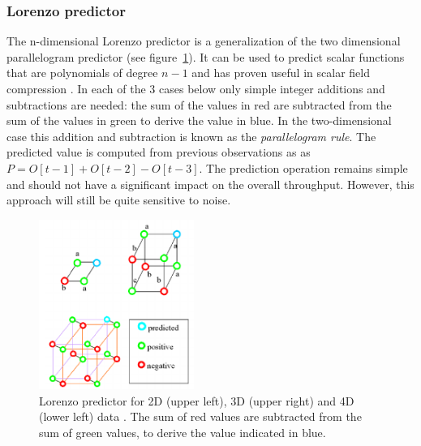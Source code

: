  \subsubsection{Lorenzo predictor}
 The n-dimensional Lorenzo predictor is a generalization of the two dimensional parallelogram predictor (see figure~\ref{LORENZO}). It can be used to predict scalar 
 functions that are polynomials of degree $n - 1$ and has proven useful in scalar field compression \cite{CGF:CGF681}. In each of the 3 cases below only simple
 integer additions and subtractions are needed: the sum of the values in red are subtracted from the sum of the values in green to derive the value in blue. In the 
 two-dimensional case this addition and subtraction is known as the \textit{parallelogram rule}. The predicted value is computed from previous observations as as 
 $P = O[t-1] + O[t-2] - O[t-3]$. The prediction operation remains simple and should not have a significant impact on the overall throughput. However, this approach will 
 still be quite sensitive to noise.
  \begin{figure}[h!]
  \begin{mdframed}
    \centering
    \includegraphics[width=0.45\textwidth]{lorenzo.png}
    \caption[Lorenzo predictor]{Lorenzo predictor for 2D (upper left), 3D (upper right) and 4D (lower left) data \cite{CGF:CGF681}. The sum of red values are subtracted from 
    the sum of green values, to derive the value indicated in blue.}
    \label{LORENZO}
  \end{mdframed}
  \end{figure} 
